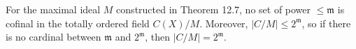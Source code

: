For the maximal ideal $M$ constructed in Theorem 12.7, no set of power $\leq \mathfrak{m}$ is cofinal in the totally ordered field $C(X)/M$. Moreover, $|C/M| \leq 2^{\mathfrak{m}}$, so if there is no cardinal between $\mathfrak{m}$ and $2^{\mathfrak{m}}$, then $|C/M| = 2^{\mathfrak{m}}$.